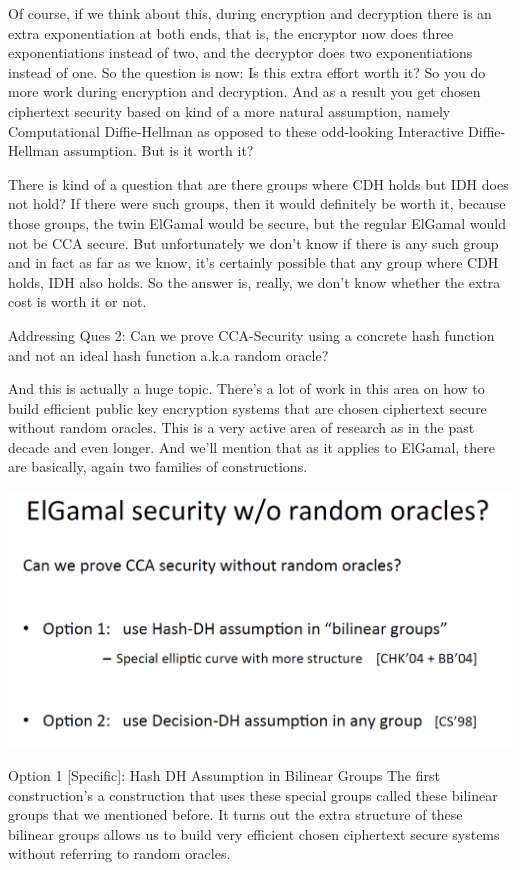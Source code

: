 \documentclass[11pt]{article}
\makeatletter
\def\maxwidth{\ifdim\Gin@nat@width>\linewidth\linewidth
    \else\Gin@nat@width\fi}
\let\Oldincludegraphics\includegraphics
\renewcommand{\includegraphics}[1]{\Oldincludegraphics[width=.8\maxwidth]{#1}}
\makeatother
\begin{document}
Of course, if we think about this, during encryption and decryption
there is an extra exponentiation at both ends, that is, the encryptor
now does three exponentiations instead of two, and the decryptor does
two exponentiations instead of one. So the question is now: Is this
extra effort worth it? So you do more work during encryption and
decryption. And as a result you get chosen ciphertext security based on
kind of a more natural assumption, namely Computational Diffie-Hellman
as opposed to these odd-looking Interactive Diffie-Hellman assumption.
But is it worth it?

There is kind of a question that are there groups where CDH holds but
IDH does not hold? If there were such groups, then it would definitely
be worth it, because those groups, the twin ElGamal would be secure, but
the regular ElGamal would not be CCA secure. But unfortunately we don't
know if there is any such group and in fact as far as we know, it's
certainly possible that any group where CDH holds, IDH also holds. So
the answer is, really, we don't know whether the extra cost is worth it
or not.

Addressing Ques 2: Can we prove CCA-Security using a concrete hash
function and not an ideal hash function a.k.a random oracle?

And this is actually a huge topic. There's a lot of work in this area on
how to build efficient public key encryption systems that are chosen
ciphertext secure without random oracles. This is a very active area of
research as in the past decade and even longer. And we'll mention that
as it applies to ElGamal, there are basically, again two families of
constructions.

\includegraphics{./Images/ElGamalSecWithoutRO.png}

Option 1 {[}Specific{]}: Hash DH Assumption in Bilinear Groups The first
construction's a construction that uses these special groups called
these bilinear groups that we mentioned before. It turns out the extra
structure of these bilinear groups allows us to build very efficient
chosen ciphertext secure systems without referring to random oracles.
\end{document}
